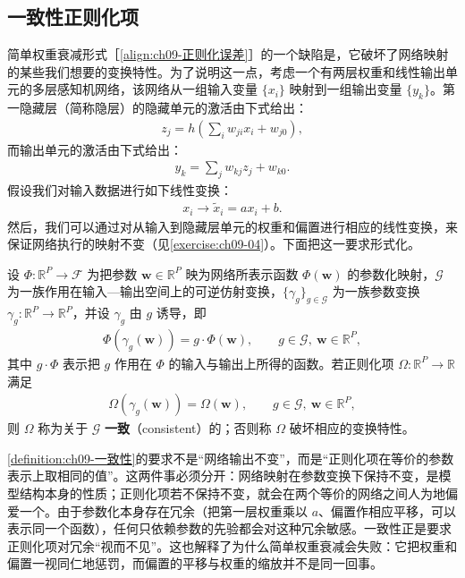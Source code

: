 \documentclass[../../main.tex]{subfiles}
\begin{document}
\subsection{一致性正则化项}\label{subsection:ch09-一致性正则化}

简单权重衰减形式［\eqref{align:ch09-正则化误差}］的一个缺陷是，它破坏了网络映射的某些我们想要的变换特性。为了说明这一点，考虑一个有两层权重和线性输出单元的多层感知机网络，该网络从一组输入变量 $\{x_{i}\}$ 映射到一组输出变量 $\{y_{k}\}$。第一隐藏层（简称隐层）的隐藏单元的激活由下式给出：
\begin{align}
z_{j}=h\!\left(\sum_{i}w_{ji}x_{i}+w_{j0}\right),
\label{align:ch09-隐层激活}
\end{align}
而输出单元的激活由下式给出：
\begin{align}
y_{k}=\sum_{j}w_{kj}z_{j}+w_{k0}.
\label{align:ch09-输出激活}
\end{align}
假设我们对输入数据进行如下线性变换：
\begin{align}
x_{i}\longrightarrow\tilde{x}_{i}=ax_{i}+b.
\label{align:ch09-输入线性变换}
\end{align}
然后，我们可以通过对从输入到隐藏层单元的权重和偏置进行相应的线性变换，来保证网络执行的映射不变（见\cref{exercise:ch09-04}）。下面把这一要求形式化。

\begin{definition}[线性变换一致性]\label{definition:ch09-一致性}
设 $\Phi:\mathbb{R}^{P}\to\mathcal{F}$ 为把参数 $\boldsymbol{w}\in\mathbb{R}^{P}$ 映为网络所表示函数 $\Phi(\boldsymbol{w})$ 的参数化映射，$\mathcal{G}$ 为一族作用在输入—输出空间上的可逆仿射变换，$\{\gamma_{g}\}_{g\in\mathcal{G}}$ 为一族参数变换 $\gamma_{g}:\mathbb{R}^{P}\to\mathbb{R}^{P}$，并设 $\gamma_{g}$ 由 $g$ 诱导，即
\begin{align*}
\Phi(\gamma_{g}(\boldsymbol{w}))=g\cdot\Phi(\boldsymbol{w}),\qquad g\in\mathcal{G},\ \boldsymbol{w}\in\mathbb{R}^{P},
\end{align*}
其中 $g\cdot\Phi$ 表示把 $g$ 作用在 $\Phi$ 的输入与输出上所得的函数。若正则化项 $\Omega:\mathbb{R}^{P}\to\mathbb{R}$ 满足
\begin{align*}
\Omega(\gamma_{g}(\boldsymbol{w}))=\Omega(\boldsymbol{w}),\qquad g\in\mathcal{G},\ \boldsymbol{w}\in\mathbb{R}^{P},
\end{align*}
则 $\Omega$ 称为关于 $\mathcal{G}$ \textbf{一致}（consistent）的；否则称 $\Omega$ 破坏相应的变换特性。
\end{definition}

\begin{remark}\cref{definition:ch09-一致性}的要求不是“网络输出不变”，而是“正则化项在等价的参数表示上取相同的值”。这两件事必须分开：网络映射在参数变换下保持不变，是模型结构本身的性质；正则化项若不保持不变，就会在两个等价的网络之间人为地偏爱一个。由于参数化本身存在冗余（把第一层权重乘以 $a$、偏置作相应平移，可以表示同一个函数），任何只依赖参数的先验都会对这种冗余敏感。一致性正是要求正则化项对冗余“视而不见”。这也解释了为什么简单权重衰减会失败：它把权重和偏置一视同仁地惩罚，而偏置的平移与权重的缩放并不是同一回事。
\end{remark}
\end{document}
